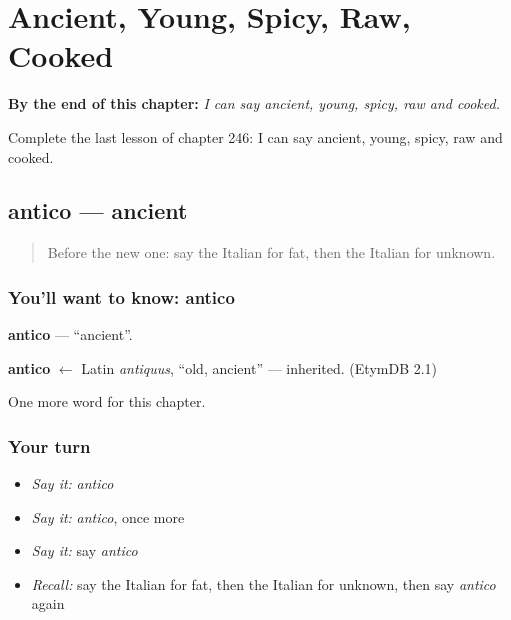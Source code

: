 
\chapter{Ancient, Young, Spicy, Raw, Cooked}
\label{ch:it-ancient-young-spicy-raw-cooked}

\begin{chapteropening}
\textbf{By the end of this chapter:} \emph{I can say ancient, young, spicy, raw and cooked.}

Complete the last lesson of chapter 246: I can say ancient, young, spicy, raw and cooked.
\end{chapteropening}

\section[antico]{antico — ancient}

\label{lesson:IT-C246-antico}



\begin{quote}
Before the new one: say the Italian for fat, then the Italian for unknown.
\end{quote}

\subsection*{You'll want to know: antico}
\textbf{antico} — \textquotedblleft{}ancient\textquotedblright{}.

\begin{cousinweb}
\textbf{antico} $\leftarrow$ Latin \emph{antiquus}, \textquotedblleft{}old, ancient\textquotedblright{} — inherited. (EtymDB 2.1)
\end{cousinweb}

\begin{grammarlens}[title={What you've built}]
One more word for this chapter.
\end{grammarlens}

\subsection*{Your turn}
\begin{itemize}
\raggedright
  \item \emph{Say it:} \emph{antico}
  \item \emph{Say it:} \emph{antico}, once more
  \item \emph{Say it:} say \emph{antico}
  \item \emph{Recall:} say the Italian for fat, then the Italian for unknown, then say \emph{antico} again
\end{itemize}

